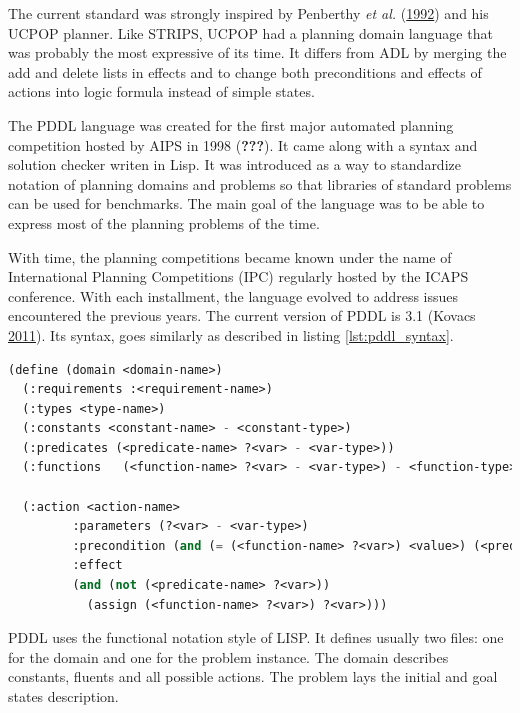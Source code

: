 \documentclass[11pt,a4paper,twoside,openright,titlepage,numbers=noenddot,headinclude,cleardoublepage=empty,openany]{scrreprt}
\theoremstyle{plain}
\theoremstyle{definition}
\theoremstyle{remark}
\begin{document}
The current standard was strongly inspired by Penberthy \emph{et al.}
(\protect\hyperlink{ref-penberthy_ucpop_1992}{1992}) and his UCPOP
planner. Like STRIPS, UCPOP had a planning domain language that was
probably the most expressive of its time. It differs from ADL by merging
the add and delete lists in effects and to change both preconditions and
effects of actions into logic formula instead of simple states.

The PDDL language was created for the first major automated planning
competition hosted by AIPS in 1998 ({\textbf{???}}). It came along with
a syntax and solution checker writen in Lisp. It was introduced as a way
to standardize notation of planning domains and problems so that
libraries of standard problems can be used for benchmarks. The main goal
of the language was to be able to express most of the planning problems
of the time.

With time, the planning competitions became known under the name of
International Planning Competitions (IPC) regularly hosted by the ICAPS
conference. With each installment, the language evolved to address
issues encountered the previous years. The current version of PDDL is
3.1 (Kovacs \protect\hyperlink{ref-kovacs_bnf_2011}{2011}). Its syntax,
goes similarly as described in listing \ref{lst:pddl_syntax}.

\begin{lstlisting}[language=Lisp, caption={Simplified explanation of the syntax of PDDL.}, escapechar={$}, label=lst:pddl_syntax]
(define (domain <domain-name>)
  (:requirements :<requirement-name>)
  (:types <type-name>)
  (:constants <constant-name> - <constant-type>)
  (:predicates (<predicate-name> ?<var> - <var-type>))
  (:functions   (<function-name> ?<var> - <var-type>) - <function-type>)

  (:action <action-name>
         :parameters (?<var> - <var-type>)
         :precondition (and (= (<function-name> ?<var>) <value>) (<predicate-name> ?<var>))
         :effect
         (and (not (<predicate-name> ?<var>))
           (assign (<function-name> ?<var>) ?<var>)))
\end{lstlisting}

PDDL uses the functional notation style of LISP. It defines usually two
files: one for the domain and one for the problem instance. The domain
describes constants, fluents and all possible actions. The problem lays
the initial and goal states description.
\end{document}
